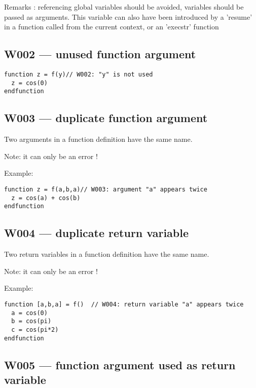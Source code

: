 Remarks : referencing global variables should be avoided, variables should be passed as arguments. This variable can also have been introduced by a 'resume' in a function called from the current context, or an 'execstr' function



\subsection{W002 --- unused function argument}


\begin{verbatim}
function z = f(y)// W002: "y" is not used
  z = cos(0)
endfunction
\end{verbatim}


\subsection{W003 --- duplicate function argument}




Two arguments in a function definition have the same name.



Note: it can only be an error !



Example:\begin{verbatim}
function z = f(a,b,a)// W003: argument "a" appears twice
  z = cos(a) + cos(b)
endfunction
\end{verbatim}




\subsection{W004 --- duplicate return variable  }




Two return variables in a function definition have the same name.



Note: it can only be an error !



Example:\begin{verbatim}
function [a,b,a] = f()  // W004: return variable "a" appears twice
  a = cos(0)
  b = cos(pi)
  c = cos(pi*2)
endfunction
\end{verbatim}




\subsection{W005 --- function argument used as return variable  }




